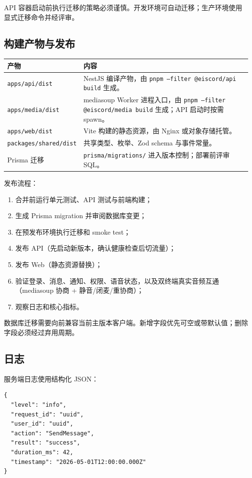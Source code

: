 API 容器启动前执行迁移的策略必须谨慎。开发环境可自动迁移；生产环境使用显式迁移命令并经评审。

\subsection{构建产物与发布}

\noindent\begin{tabularx}{\textwidth}{L{2.8cm}Y}
  \toprule
  产物 & 内容 \\
  \midrule
  \texttt{apps/api/dist} & NestJS 编译产物，由 \texttt{pnpm --filter @eiscord/api build} 生成。 \\
  \texttt{apps/media/dist} & mediasoup Worker 进程入口，由 \texttt{pnpm --filter @eiscord/media build} 生成；API 启动时按需 spawn。 \\
  \texttt{apps/web/dist} & Vite 构建的静态资源，由 Nginx 或对象存储托管。 \\
  \texttt{packages/shared/dist} & 共享类型、枚举、Zod schema 与事件常量。 \\
  Prisma 迁移 & \texttt{prisma/migrations/} 进入版本控制；部署前评审 SQL。 \\
  \bottomrule
\end{tabularx}

发布流程：

\begin{enumerate}
  \item 合并前运行单元测试、API 测试与前端构建；
  \item 生成 Prisma migration 并审阅数据库变更；
  \item 在预发布环境执行迁移和 smoke test；
  \item 发布 API（先启动新版本，确认健康检查后切流量）；
  \item 发布 Web（静态资源替换）；
  \item 验证登录、消息、通知、权限、语音状态，以及双终端真实音频互通（mediasoup 协商 + 静音/闭麦/重协商）；
  \item 观察日志和核心指标。
\end{enumerate}

数据库迁移需要向前兼容当前主版本客户端。新增字段优先可空或带默认值；删除字段必须经过弃用周期。

\subsection{日志}

服务端日志使用结构化 JSON：

\begin{verbatim}
{
  "level": "info",
  "request_id": "uuid",
  "user_id": "uuid",
  "action": "SendMessage",
  "result": "success",
  "duration_ms": 42,
  "timestamp": "2026-05-01T12:00:00.000Z"
}
\end{verbatim}

